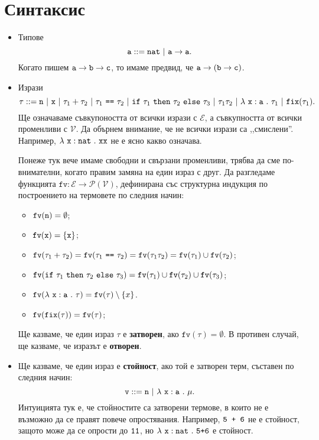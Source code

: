 \section{Синтаксис}

\newcommand{\rename}[2]{\{\vv{#1}/{#2}\}}

\newcommand{\var}{\texttt{var}}
\newcommand{\fv}{\texttt{fv}}

\begin{itemize}
\item{}
  Типове
  \[\vv{a} ::= \vv{nat}\ |\ \vv{a} \to \vv{a}.\]
  Когато пишем 
  $\texttt{a} \to \texttt{b} \to \texttt{c}$, то имаме предвид, че
  $\texttt{a} \to (\texttt{b} \to \texttt{c})$.
\item{}
  Изрази
  \[\tau ::= \vv{n}\ |\ \vv{x}\ |\ \tau_1 + \tau_2\ |\ \tau_1\ \vv{==}\ \tau_2\ |\ \ifelse{\tau_1}{\tau_2}{\tau_3}\ |\ \tau_1\tau_2\ |\ \lamb{x}{a}{\tau_1}\ |\ \fix(\tau_1).\]
  Ще означаваме съвкупоността от всички изрази с $\mathcal{E}$, а съвкупността от всички променливи с $\mathcal{V}$.
  Да обърнем внимание, че не всички изрази са ,,смислени''. Например,
  $\lambda~\texttt{x}:\texttt{nat}~.~{\texttt{xx}}$ не е ясно какво означава.
  
  Понеже тук вече имаме свободни и свързани променливи, трябва да сме по-внимателни, когато правим замяна на един израз с друг. Да разгледаме функцията $\fv:\mathcal{E} \to \mathcal{P}(\mathcal{V})$, дефинирана със структурна индукция по построението на термовете по следния начин:
  
  \begin{itemize}
  \item
    $\fv(\vv{n}) = \emptyset$;
  \item
    $\fv(\vv{x}) = \{\vv{x}\}$;
  \item
    $\fv(\tau_1 + \tau_2) = \fv(\tau_1\ \vv{==}\ \tau_2) = \fv(\tau_1\tau_2) = \fv(\tau_1) \cup \fv(\tau_2)$;
  \item
    $\fv(\ifelse{\tau_1}{\tau_2}{\tau_3}) = \fv(\tau_1) \cup \fv(\tau_2) \cup \fv(\tau_3)$;
  \item
    $\fv(\lamb{x}{a}{\tau}) = \fv(\tau) \setminus \{x\}$.
  \item
    $\fv(\fix(\tau)) = \fv(\tau)$;
  \end{itemize}
  
  Ще казваме, че един израз $\tau$ е {\bf затворен}, ако $\fv(\tau) = \emptyset$.
  В противен случай, ще казваме, че изразът е {\bf отворен}.
\item
  Ще казваме, че един израз е {\bf стойност}, ако той е затворен терм, съставен по следния начин:
  \[\texttt{v} ::= \texttt{n}\ |\ \lambda~\texttt{x}:\texttt{a}~.~{\mu}.\]
  Интуицията тук е, че стойностите са затворени термове, в които не е възможно да се правят повече опростявания.
  Например, $\texttt{5 + 6}$ не е стойност, защото може да се опрости до $\texttt{11}$,
  но $\lambda~\texttt{x}:\texttt{nat}~.~{\texttt{5+6}}$ е стойност.
\end{itemize}

